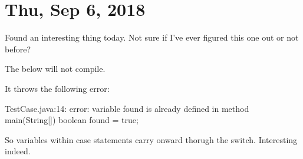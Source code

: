 \section{Thu, Sep 6, 2018}

Found an interesting thing today. Not sure if I've ever figured this one out or not
before?

The below will not compile.



It throws the following error:

\begin{displayquote}
TestCase.java:14: error: variable found is already defined in method main(String[])
        boolean found = true;
\end{displayquote}

So variables within case statements carry onward thorugh the switch. Interesting
indeed.